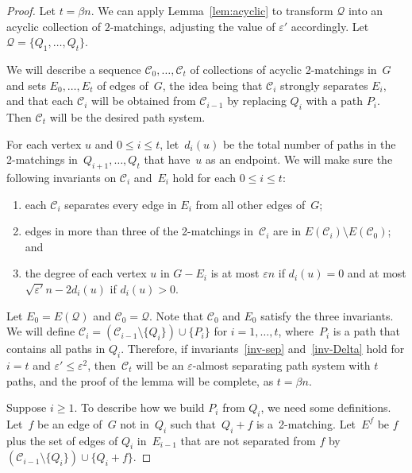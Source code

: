 \documentclass[a4paper, 11pt,reqno]{amsart}
\newcommand{\calC}{\mathcal{C}}
\newcommand{\calQ}{\mathcal{Q}}
\theoremstyle{plain}
\theoremstyle{definition}
\numberwithin{equation}{section}
\newcommand{\eps}{\varepsilon}
\begin{document}
\begin{proof} 
  Let $t = \beta n$.  We can apply Lemma~\ref{lem:acyclic} to transform $\calQ$ 
  into an acyclic collection of $2$-matchings, adjusting the value of $\eps'$ accordingly. 
  Let $\calQ = \{Q_1, \dotsc, Q_t\}$. 
  
  We will describe a sequence $\calC_0,\ldots,\calC_t$ of collections of acyclic 2-matchings in~$G$ 
  and sets $E_0,\ldots,E_t$ of edges of~$G$, the idea being that $\mathcal{C}_i$ strongly separates $E_i$, 
  and that each $\mathcal{C}_i$ will be obtained from $\mathcal{C}_{i-1}$ by replacing $Q_i$ with a path $P_i$. 
  Then $\mathcal{C}_t$ will be the desired path system.
  
  For each vertex $u$ and $0 \leq i \leq t$, let~$d_i(u)$ be the total number of paths 
  in the 2-matchings in~$Q_{i+1},\ldots,Q_t$ that have~$u$ as an endpoint. 
  We will make sure the following invariants on $\calC_i$ and~$E_i$ hold for each $0 \leq i \leq t$: 
  \begin{enumerate}[\upshape{\textbf{(I\arabic*)}},labelindent=0pt,labelwidth=\widthof{\ref{inv-Delta}},leftmargin=!]
  	\item each $\calC_i$ separates every edge in $E_i$ from all other edges of~$G$;\label{inv-sep}
  	\item edges in more than three of the 2-matchings in~$\calC_i$ are 
  	in $E(\calC_i) \setminus E(\calC_0)$; and\label{inv-3x}
  	\item the degree of each vertex $u$ in $G-E_i$ is at most $\eps n$ if $d_i(u) = 0$ 
  	and at most $\sqrt{\eps'}n - 2d_i(u)$ if $d_i(u) > 0$.\label{inv-Delta}
  \end{enumerate}
  
  Let $E_0 = E(\calQ)$ and $\calC_0 = \calQ$.  
  Note that $\calC_0$ and $E_0$ satisfy the three invariants.
  We will define $\calC_i = (\calC_{i-1} \setminus \{Q_i\}) \cup \{P_i\}$ 
  for $i=1,\ldots,t$, where~$P_i$ is a path that contains all paths in $Q_i$.  
  Therefore, if invariants~\ref{inv-sep} and~\ref{inv-Delta} hold for $i = t$ 
  and $\eps' \leq \eps^2$, then~$\calC_t$ will be an $\eps$-almost separating path 
  system with $t$ paths, and the proof of the lemma will be complete, as $t = \beta n$. 
  
  Suppose $i \geq 1$. To describe how we build $P_i$ from $Q_i$, we need some definitions. 
  Let~$f$ be an edge of~$G$ not in~$Q_i$ such that~$Q_i+f$ is a~2-matching. 
  Let~$E^f$ be $f$ plus the set of edges of $Q_i$ in~$E_{i-1}$ that are not 
  separated from $f$ by~$(\calC_{i-1} \setminus \{Q_i\}) \cup \{Q_i+f\}$. 


\end{proof}
\end{document}
